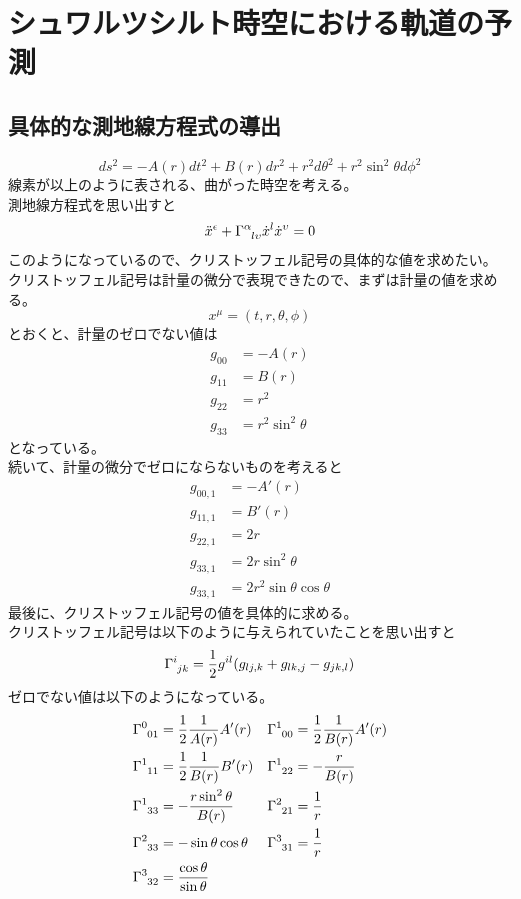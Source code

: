 \documentclass[dvipdfmx]{report} %
\begin{document}
\section{
	シュワルツシルト時空における軌道の予測
}
\subsection{
	具体的な測地線方程式の導出
}

\[
ds^2 = -A(r)dt^2 + B(r)dr^2 + r^2d \theta^2 + r^2 \sin^2 \theta d\phi^2
\]
線素が以上のように表される、曲がった時空を考える。\\
測地線方程式を思い出すと
\[
\ddot{x}^{\epsilon} + \tensor{\Gamma}{^{\alpha}_{l \upsilon}} \dot{x}^l \dot{x}^{\upsilon} = 0
\]
このようになっているので、クリストッフェル記号の具体的な値を求めたい。\\
クリストッフェル記号は計量の微分で表現できたので、まずは計量の値を求める。\\
\[
x^{\mu} = ( t, r, \theta, \phi )
\]
とおくと、計量のゼロでない値は
\begin{equation*}
\begin{split}
g_{00} &= -A(r)\\
g_{11} &= B(r)\\
g_{22} &= r^2\\
g_{33} &= r^2 \sin^2 \theta
\end{split}
\end{equation*}
となっている。\\
続いて、計量の微分でゼロにならないものを考えると
\begin{equation*}
\begin{split}
g_{00,1} &= -A'(r)\\
g_{11,1} &= B'(r)\\
g_{22,1} &= 2r\\
g_{33,1} &= 2r \sin^2 \theta\\
g_{33,1} &= 2 r^2 \sin \theta \cos \theta
\end{split}
\end{equation*}
最後に、クリストッフェル記号の値を具体的に求める。\\
クリストッフェル記号は以下のように与えられていたことを思い出すと
\[
\tensor{\Gamma}{^i_{jk}} = \frac{1}{2} g^{il} (g_{lj,k} + g_{lk,j} - g_{jk,l})
\]
ゼロでない値は以下のようになっている。
\begin{align*}
\tensor{\Gamma}{^0_{01}} &= \frac{1}{2} \frac{1}{A(r)} A'(r) &
\tensor{\Gamma}{^1_{00}} &= \frac{1}{2} \frac{1}{B(r)} A'(r)\\
\tensor{\Gamma}{^1_{11}} &= \frac{1}{2} \frac{1}{B(r)} B'(r) &
\tensor{\Gamma}{^1_{22}} &= - \frac{r}{B(r)}\\
\tensor{\Gamma}{^1_{33}} &= - \frac{r \sin^2 \theta}{B(r)} &
\tensor{\Gamma}{^2_{21}} &= \frac{1}{r}\\
\tensor{\Gamma}{^2_{33}} &= - \sin \theta \cos \theta &
\tensor{\Gamma}{^3_{31}} &= \frac{1}{r}\\
\tensor{\Gamma}{^3_{32}} &= \frac{ \cos \theta }{ \sin \theta }
\end{align*}
\end{document}
